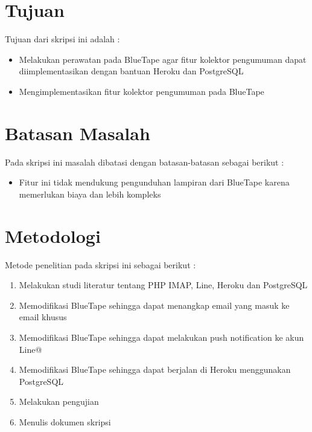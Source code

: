 \section{Tujuan}
\label{sec:tujuan}
Tujuan dari skripsi ini adalah :
\begin{itemize}
\item Melakukan perawatan pada BlueTape agar fitur kolektor pengumuman dapat diimplementasikan dengan bantuan Heroku dan PostgreSQL
\item Mengimplementasikan fitur kolektor pengumuman pada BlueTape
\end{itemize}

\section{Batasan Masalah}
\label{sec:batasan}
Pada skripsi ini masalah dibatasi dengan batasan-batasan sebagai berikut :
\begin{itemize}
\item Fitur ini tidak mendukung pengunduhan lampiran dari BlueTape karena memerlukan biaya dan lebih kompleks
\end{itemize}

\section{Metodologi}
\label{sec:metodepenelitian}
Metode penelitian pada skripsi ini sebagai berikut :
	\begin{enumerate}
		\item Melakukan studi literatur tentang PHP IMAP, Line, Heroku dan PostgreSQL
		\item Memodifikasi BlueTape sehingga dapat menangkap email yang masuk ke email khusus
		\item Memodifikasi BlueTape sehingga dapat melakukan push notification ke akun Line@
		\item Memodifikasi BlueTape sehingga dapat berjalan di Heroku menggunakan PostgreSQL
		\item Melakukan pengujian
		\item Menulis dokumen skripsi
	\end{enumerate}

